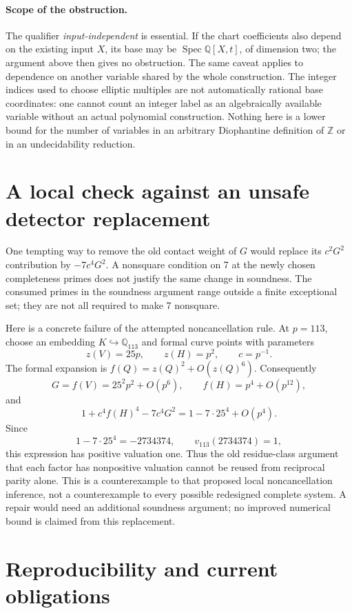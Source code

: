 \documentclass[11pt]{article}
\newcommand{\Q}{\mathbb Q}
\newcommand{\Z}{\mathbb Z}
\begin{document}
\paragraph{Scope of the obstruction.}
The qualifier \emph{input-independent} is essential.
If the chart coefficients also depend on the existing
input \(X\), its base may be
\(\operatorname{Spec}\Q[X,t]\), of dimension two;
the argument above then gives no obstruction.
The same caveat applies to dependence on another
variable shared by the whole construction. The
integer indices used to choose elliptic multiples
are not automatically rational base coordinates:
one cannot count an integer label as an
algebraically available variable without an
actual polynomial construction. Nothing here
is a lower bound for the number of variables
in an arbitrary Diophantine definition of
\(\Z\) or in an undecidability reduction.

\section{A local check against an unsafe detector replacement}

One tempting way to remove the old contact weight
of \(G\) would replace its \(c^2G^2\) contribution
by \(-7c^4G^2\). A nonsquare condition on 7 at
the newly chosen completeness primes does not
justify the same change in soundness. The consumed
primes in the soundness argument range outside
a finite exceptional set; they are not all
required to make 7 nonsquare.

Here is a concrete failure of the attempted
noncancellation rule. At \(p=113\), choose an
embedding \(K\hookrightarrow\Q_{113}\) and
formal curve points with parameters
\[
                 z(V)=25p,\qquad z(H)=p^2,\qquad c=p^{-1}.
\]
The formal expansion is
\(f(Q)=z(Q)^2+O(z(Q)^6)\). Consequently
\[
 G=f(V)=25^2p^2+O(p^6),\qquad
 f(H)=p^4+O(p^{12}),
\]
and
\[
        1+c^4f(H)^4-7c^4G^2
                  =1-7\cdot25^4+O(p^4).
\]
Since
\[
       1-7\cdot25^4=-2734374,\qquad
       v_{113}(2734374)=1,
\]
this expression has positive valuation one.
Thus the old residue-class argument that each
factor has nonpositive valuation cannot be
reused from reciprocal parity alone.
This is a counterexample to that proposed
local noncancellation inference, not a
counterexample to every possible redesigned
complete system. A repair would need an
additional soundness argument; no improved
numerical bound is claimed from this replacement.

\section{Reproducibility and current obligations}
\end{document}
